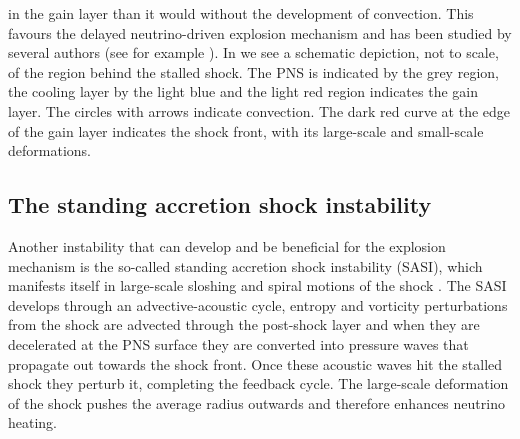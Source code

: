 in the gain layer than it would without the development of convection.
This favours the delayed neutrino-driven explosion mechanism and has been studied by several authors
(see for example \cite{herant_94,burrows_95,janka_96,foglizzo_06,mueller_12a}).
In  we see a schematic depiction, not to scale, of
the region behind the stalled shock. The PNS is indicated by the grey region, the cooling layer by the light blue and
the light red region indicates the gain layer. The circles with arrows indicate convection. The dark red curve
at the edge of the gain layer indicates the shock front, with its large-scale and small-scale deformations.

\subsection{The standing accretion shock instability}
Another instability that can develop and be beneficial for the explosion mechanism is 
the so-called standing accretion shock instability (SASI), which manifests itself in large-scale 
sloshing and spiral motions of the shock \citep{blondin_03,blondin_06,foglizzo_07,ohnishi_06,ohnishi_08,scheck_08,guilet_12,foglizzo_15}.
The SASI develops through an advective-acoustic cycle, entropy and vorticity perturbations from the shock are advected through the
post-shock layer and when they are decelerated at the PNS surface they are converted into pressure waves that propagate
out towards the shock front. Once these acoustic waves hit the stalled shock they perturb it, completing the feedback
cycle. The large-scale deformation of the shock pushes the average radius outwards and therefore enhances neutrino heating.
 
